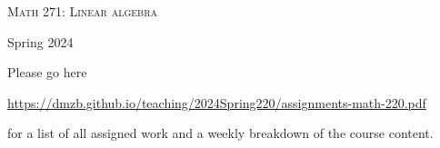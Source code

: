 \documentclass[12pt]{article}
\begin{document}
\begin{center}
{\Large \textsc{Math 271: Linear algebra}}
\end{center}
\begin{center}
Spring 2024
\end{center}



\noindent Please go here 
\begin{center}
 \url{https://dmzb.github.io/teaching/2024Spring220/assignments-math-220.pdf}
\end{center}
for a list of all assigned work and a weekly breakdown of the course content.
\end{document}
